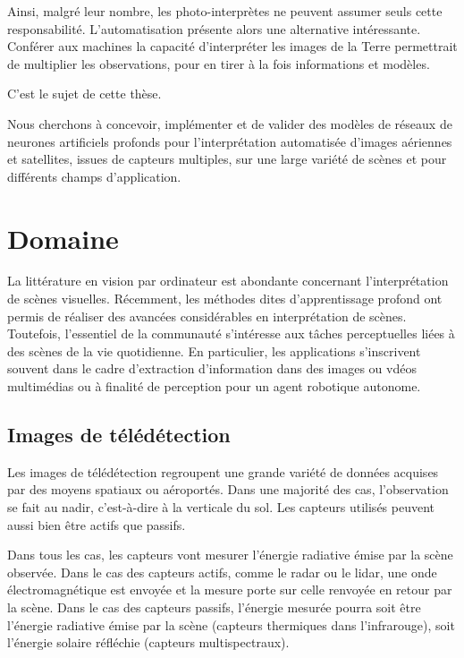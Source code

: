 Ainsi, malgré leur nombre, les photo-interprètes ne peuvent assumer seuls cette responsabilité. L'automatisation présente alors une alternative intéressante. Conférer aux machines la capacité d'interpréter les images de la Terre permettrait de multiplier les observations, pour en tirer à la fois informations et modèles.

C'est le sujet de cette thèse.

Nous cherchons à concevoir, implémenter et de valider des modèles de réseaux de neurones artificiels profonds pour l'interprétation automatisée d'images aériennes et satellites, issues de capteurs multiples, sur une large variété de scènes et pour différents champs d'application.

\section{Domaine}

La littérature en vision par ordinateur est abondante concernant l'interprétation de scènes visuelles. Récemment, les méthodes dites d'apprentissage profond ont permis de réaliser des avancées considérables en interprétation de scènes. Toutefois, l'essentiel de la communauté s'intéresse aux tâches perceptuelles liées à des scènes de la vie quotidienne. En particulier, les applications s'inscrivent souvent dans le cadre d'extraction d'information dans des images ou vdéos multimédias ou à finalité de perception pour un agent robotique autonome.

\subsection{Images de télédétection}

Les images de télédétection regroupent une grande variété de données acquises par des moyens spatiaux ou aéroportés. Dans une majorité des cas, l'observation se fait au nadir, c'est-à-dire à la verticale du sol. Les capteurs utilisés peuvent aussi bien être actifs que passifs.

Dans tous les cas, les capteurs vont mesurer l'énergie radiative émise par la scène observée. Dans le cas des capteurs actifs, comme le radar ou le lidar, une onde électromagnétique est envoyée et la mesure porte sur celle renvoyée en retour par la scène. Dans le cas des capteurs passifs, l'énergie mesurée pourra soit être l'énergie radiative émise par la scène (capteurs thermiques dans l'infrarouge), soit l'énergie solaire réfléchie (capteurs multispectraux).

